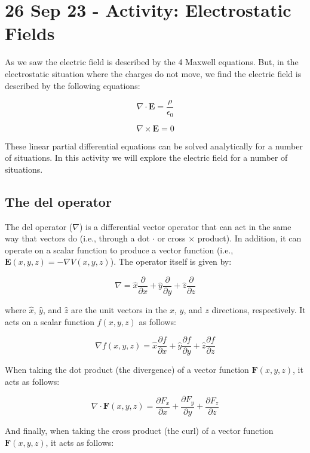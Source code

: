 \section{26 Sep 23 - Activity: Electrostatic
Fields}\label{sep-23---activity-electrostatic-fields}

As we saw the electric field is described by the 4 Maxwell equations.
But, in the electrostatic situation where the charges do not move, we
find the electric field is described by the following equations:

\[\nabla \cdot \mathbf{E} = \frac{\rho}{\epsilon_0}\]

\[\nabla \times \mathbf{E} = 0\]

These linear partial differential equations can be solved analytically
for a number of situations. In this activity we will explore the
electric field for a number of situations.

\subsection{The del operator}\label{the-del-operator}

The del operator (\(\nabla\)) is a differential vector operator that can
act in the same way that vectors do (i.e., through a dot \(\cdot\) or
cross \(\times\) product). In addition, it can operate on a scalar
function to produce a vector function (i.e.,
\(\mathbf{E}(x,y,z) = - \nabla V(x,y,z)\)). The operator itself is given
by:

\[\nabla = \hat{x} \frac{\partial}{\partial x} + \hat{y} \frac{\partial}{\partial y} + \hat{z} \frac{\partial}{\partial z}\]

where \(\hat{x}\), \(\hat{y}\), and \(\hat{z}\) are the unit vectors in
the \(x\), \(y\), and \(z\) directions, respectively. It acts on a
scalar function \(f(x,y,z)\) as follows:

\[\nabla f(x,y,z) = \hat{x} \frac{\partial f}{\partial x} + \hat{y} \frac{\partial f}{\partial y} + \hat{z} \frac{\partial f}{\partial z}\]

When taking the dot product (the divergence) of a vector function
\(\mathbf{F}(x,y,z)\), it acts as follows:

\[\nabla \cdot \mathbf{F}(x,y,z) = \frac{\partial F_x}{\partial x} + \frac{\partial F_y}{\partial y} + \frac{\partial F_z}{\partial z}\]

And finally, when taking the cross product (the curl) of a vector
function \(\mathbf{F}(x,y,z)\), it acts as follows:

